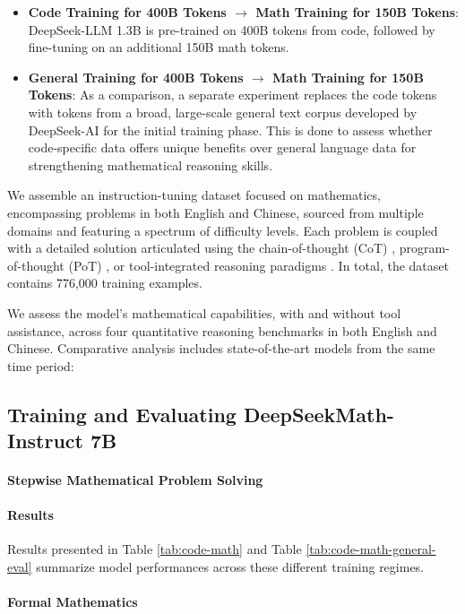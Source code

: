 \begin{itemize}[topsep=0pt]
\begin{itemize}[topsep=0pt]
    \item \textbf{Code Training for 400B Tokens $\rightarrow$ Math Training for 150B Tokens}: DeepSeek-LLM 1.3B is pre-trained on 400B tokens from code, followed by fine-tuning on an additional 150B math tokens.
    \item \textbf{General Training for 400B Tokens $\rightarrow$ Math Training for 150B Tokens}: As a comparison, a separate experiment replaces the code tokens with tokens from a broad, large-scale general text corpus developed by DeepSeek-AI for the initial training phase. This is done to assess whether code-specific data offers unique benefits over general language data for strengthening mathematical reasoning skills.
\end{itemize}

We assemble an instruction-tuning dataset focused on mathematics, encompassing problems in both English and Chinese, sourced from multiple domains and featuring a spectrum of difficulty levels. Each problem is coupled with a detailed solution articulated using the chain-of-thought (CoT) \citep{cot}, program-of-thought (PoT) \citep{pot,pal}, or tool-integrated reasoning paradigms \citep{tora}. In total, the dataset contains 776,000 training examples.

We assess the model’s mathematical capabilities, with and without tool assistance, across four quantitative reasoning benchmarks in both English and Chinese. Comparative analysis includes state-of-the-art models from the same time period:

\subsection{Training and Evaluating DeepSeekMath-Instruct 7B}

\paragraph{Stepwise Mathematical Problem Solving}

\paragraph{Results}
Results presented in Table \ref{tab:code-math} and Table \ref{tab:code-math-general-eval} summarize model performances across these different training regimes.

\paragraph{Formal Mathematics}


\end{itemize}
